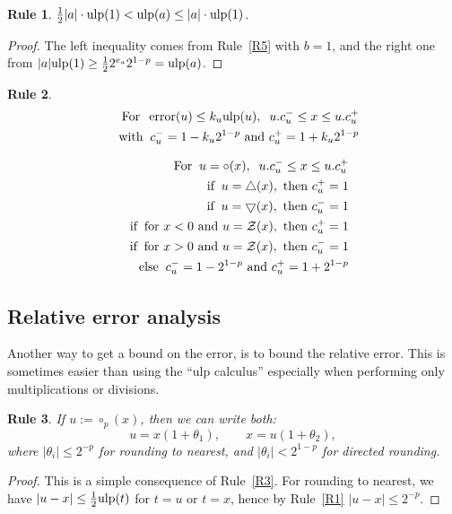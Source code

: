 \documentclass[12pt]{amsart}
\def\n{\textnormal}
\def\pinf{\bigtriangleup}
\def\minf{\bigtriangledown}
\def\ulp{{\rm ulp}}
\def\Z{{\mathcal Z}}
\DeclareMathOperator{\error}{error}
\newtheorem{Rule}{Rule}
\begin{document}
\begin{Rule} \label{R7}
$\frac{1}{2} |a| \cdot \ulp(1) < \ulp(a) \leq |a| \cdot \ulp(1)$.
\end{Rule}
\begin{proof}
The left inequality comes from Rule~\ref{R5} with $b=1$,
and the right one from $|a| \ulp(1) \geq \frac{1}{2} 2^{e_a} 2^{1-p} =\ulp(a)$.
\end{proof}

\begin{Rule} \label{R9}
\begin{eqnarray}\nonumber
&&\n{For}\;\;  \error(u) \leq k_u \ulp(u),\;\; u.c_u^- \leq x \leq u.c_u^+\\\nonumber
&&\n{with}\;\;   c_u^{-}=1- k_u 2^{1-p} \n{ and } c_u^{+}=1+ k_u 2^{1-p}
\end{eqnarray}

\begin{eqnarray}\nonumber
&&\n{For}\;\;  u=\circ(x),\;\; u.c_u^- \leq x \leq u.c_u^+\\\nonumber
&&\n{if}\;\;  u=\pinf(x),\n{ then } c_u^+=1\\\nonumber
&&\n{if}\;\;  u=\minf(x),\n{ then } c_u^-=1\\\nonumber
&&\n{if}\;\;  \n{for $x<0$ and } u=\Z(x),\n{ then } c_u^+=1 \\\nonumber
&&\n{if}\;\;  \n{for $x>0$ and } u=\Z(x),\n{ then } c_u^-=1 \\\nonumber
&&\n{else}\;\;   c_u^{-}=1-2^{1-p} \n{ and } c_u^{+}=1+2^{1-p}
\end{eqnarray}
\end{Rule}

\subsection{Relative error analysis}

Another way to get a bound on the error,
is to bound the relative error. This is sometimes easier than using the
``ulp calculus'' especially when performing only multiplications or divisions.

\begin{Rule} \label{R10}
If $u := \circ_p(x)$, then we can write both:
\[ u = x (1 + \theta_1), \qquad x = u (1 + \theta_2), \]
where $|\theta_i| \leq 2^{-p}$ for rounding to nearest, and
$|\theta_i| < 2^{1-p}$ for directed rounding.
\end{Rule}
\begin{proof}
This is a simple consequence of Rule~\ref{R3}. For rounding to nearest,
we have $|u-x| \leq \frac{1}{2} \ulp(t)$ for $t=u$ or $t=x$, hence by
Rule~\ref{R1} $|u-x| \leq 2^{-p}$.
\end{proof}
\end{document}
